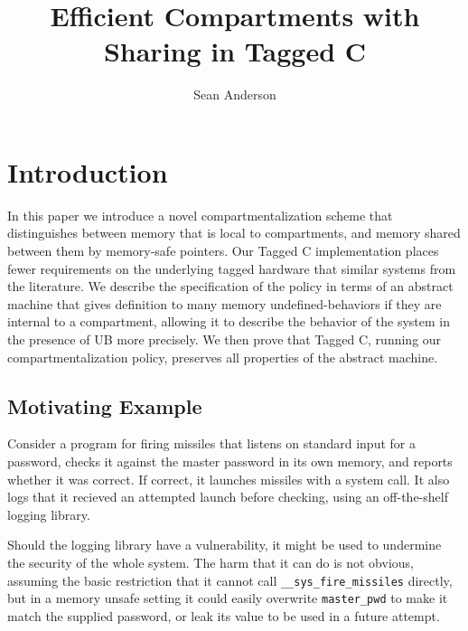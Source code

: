 \documentclass{article}
\title{Efficient Compartments with Sharing in Tagged C}
\author{Sean Anderson}
\begin{document}
\maketitle




\section{Introduction}

In this paper we introduce a novel compartmentalization scheme that distinguishes between memory
that is local to compartments, and memory shared between them by memory-safe pointers. Our Tagged
C implementation places fewer requirements on the underlying tagged hardware that similar systems
from the literature. We describe the specification of the policy in terms of an abstract machine
that gives definition to many memory undefined-behaviors if they are internal to a compartment,
allowing it to describe the behavior of the system in the presence of UB more precisely. We then prove
that Tagged C, running our compartmentalization policy, preserves all properties of the abstract
machine.

\subsection{Motivating Example}

Consider a program for firing missiles that listens on standard input for a password,
checks it against the master password in its own memory, and reports whether it was correct.
If correct, it launches missiles with a system call. It also logs that it recieved an attempted
launch before checking, using an off-the-shelf logging library.

Should the logging library have a vulnerability, it might be used to undermine the security
of the whole system. The harm that it can do is not obvious, assuming the basic restriction that
it cannot call {\tt \_\_sys\_fire\_missiles} directly, but in a memory unsafe setting it could
easily overwrite {\tt master\_pwd} to make it match the supplied password, or leak its value to
be used in a future attempt.
\end{document}
